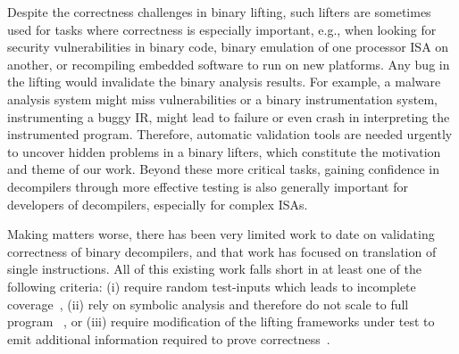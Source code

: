Despite the correctness challenges in binary lifting, such lifters are sometimes
used for tasks where correctness is especially important, e.g., when looking for security
vulnerabilities in binary code, binary emulation of one processor ISA on another,
or recompiling embedded software to run on new platforms.
Any bug in the lifting would invalidate the binary analysis results.
For example, a malware analysis system might miss vulnerabilities or a binary
instrumentation system, instrumenting a buggy IR, might lead to failure or
even crash in interpreting the instrumented program. Therefore, automatic
validation tools are needed urgently to uncover hidden problems in a binary
lifters, which constitute the motivation and theme of our work.
%
Beyond these more critical tasks, gaining confidence in decompilers through more 
effective testing is also generally important for developers of decompilers,
especially for complex ISAs.
%

Making matters worse, there has been very limited work to date on validating correctness of binary
decompilers, and that work has focused on translation of single instructions. 
All of this existing work falls short in at least
one of the following criteria: (i) require random test-inputs which leads to
incomplete coverage~\cite{Martignoni:ISSTA2009,
Martignoni:ISSTA2010,CLSS2015}, (ii) rely on symbolic analysis
and therefore do not scale to full program
\tv~\cite{Martignoni:ASPLOS2012,ASE2017}, or (iii) require modification of the
lifting frameworks under test to emit additional information required to prove
correctness~\cite{Galois:SPISA19}.



